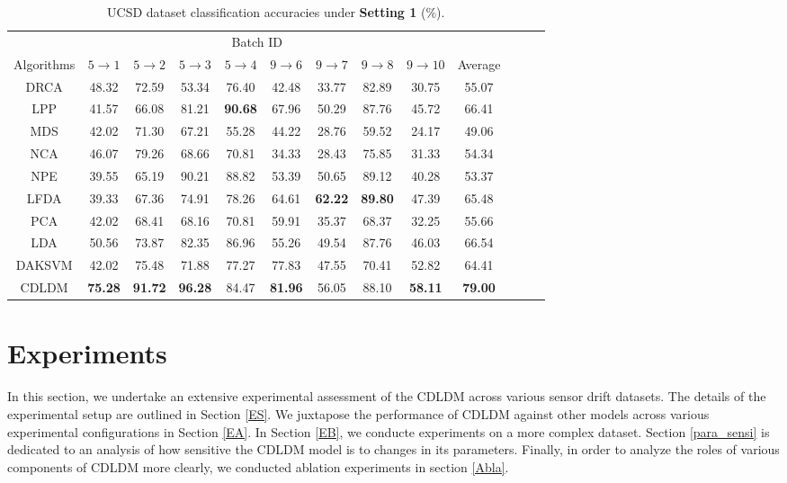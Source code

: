\documentclass[a4paper]{cas-sc}
\begin{document}
\begin{table}[ht]
\centering
\setlength{\abovecaptionskip}{0pt}
\caption{
UCSD dataset classification accuracies under \textbf{Setting 1} (\%).}
\setlength{\tabcolsep}{3.2 mm}
\begin{tabular}{@{}ccccccccccccc@{}}
\toprule
 \multicolumn{10}{c}{Batch ID}  \\
\cmidrule(lr){2-10}
Algorithms & $5 \rightarrow 1$ & $5 \rightarrow 2$ & $5 \rightarrow 3$ & $5 \rightarrow 4$ & $9 \rightarrow 6$ & $9 \rightarrow 7$ & $9 \rightarrow 8$ & $9 \rightarrow 10$ & Average \\
\midrule
DRCA & 48.32 & 72.59 & 53.34 & 76.40 & 42.48 & 33.77 & 82.89 & 30.75 & 55.07 \\
LPP & 41.57 & 66.08 & 81.21 & \bfseries{90.68} & 67.96 & 50.29 & 87.76 & 45.72 & 66.41 \\
MDS & 42.02 & 71.30 & 67.21 & 55.28 & 44.22 & 28.76 & 59.52 & 24.17 & 49.06 \\
NCA & 46.07 & 79.26 & 68.66 & 70.81 & 34.33 & 28.43 & 75.85 & 31.33 & 54.34 \\
NPE & 39.55 & 65.19 & 90.21 & 88.82 & 53.39 & 50.65 & 89.12 & 40.28 & 53.37 \\
LFDA & 39.33 & 67.36 & 74.91 & 78.26 & 64.61 & \bfseries{62.22} & \bfseries{89.80} & 47.39 & 65.48 \\
PCA & 42.02 & 68.41 & 68.16 & 70.81 & 59.91 & 35.37 & 68.37 & 32.25 & 55.66 \\
LDA & 50.56 & 73.87 & 82.35 & 86.96 & 55.26 & 49.54 & 87.76 & 46.03 & 66.54 \\
DAKSVM & 42.02 & 75.48 & 71.88 & 77.27 & 77.83 & 47.55 & 70.41 & 52.82 & 64.41 \\
CDLDM & \bfseries{75.28} & \bfseries{91.72} & \bfseries{96.28} & 84.47 & \bfseries{81.96} & 56.05 & 88.10 & \bfseries{58.11} & \bfseries{79.00} \\
\bottomrule
\end{tabular}
\label{4.2.1}
\end{table}


\section{Experiments}\label{Experiments}
In this section, we undertake an extensive experimental assessment of the CDLDM across various sensor drift datasets. The details of the experimental setup are outlined in Section \ref{ES}. We juxtapose the performance of CDLDM against other models across various experimental configurations in Section \ref{EA}. In Section \ref{EB}, we conducte experiments on a more complex dataset. Section \ref{para_sensi} is dedicated to an analysis of how sensitive the CDLDM model is to changes in its parameters. Finally, in order to analyze the roles of various components of CDLDM more clearly, we conducted ablation experiments in section \ref{Abla}.
\end{document}
